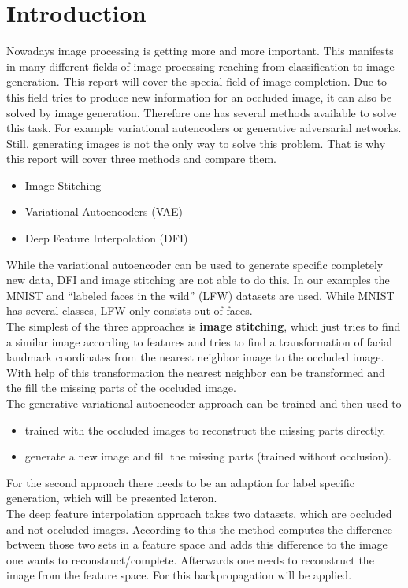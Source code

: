 \documentclass[
     11pt,         %
     a4paper,      %
     oneside,
     ]{article}
\begin{document}
\section{Introduction}
Nowadays image processing is getting more and more important. This manifests in many different fields of image processing reaching from classification to image generation.
This report will cover the special field of image completion. Due to this field tries to produce new information for an occluded image, it can also be solved by image generation.
Therefore one has several methods available to solve this task. For example variational autencoders or generative adversarial networks. Still, generating images is not the only way to solve this problem. That is why this report will cover three methods and compare them.
\begin{itemize}
  \item Image Stitching
  \item Variational Autoencoders (VAE)
  \item Deep Feature Interpolation (DFI)
\end{itemize}
While the variational autoencoder can be used to generate specific completely new data, DFI and image stitching are not able to do this.
In our examples the MNIST and \enquote{labeled faces in the wild} (LFW) datasets are used. While MNIST has several classes, LFW only consists out of faces. \\
The simplest of the three approaches is \textbf{image stitching}, which just tries to find a similar image according to features and tries to find a transformation of facial landmark coordinates from the nearest neighbor image to the occluded image. With help of this transformation the nearest neighbor can be transformed and the fill the missing parts of the occluded image.\\
The generative variational autoencoder approach can be trained and then used to
\begin{itemize}
  \item trained with the occluded images to reconstruct the missing parts directly.
  \item generate a new image and fill the missing parts (trained without occlusion).
\end{itemize}
For the second approach there needs to be an adaption for label specific generation, which will be presented lateron. \\
The deep feature interpolation approach takes two datasets, which are occluded and not occluded images. According to this the method computes the difference between those two sets in a feature space and adds this difference to the image one wants to reconstruct/complete. Afterwards one needs to reconstruct the image from the feature space. For this backpropagation will be applied.
\end{document}
